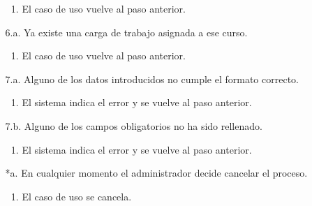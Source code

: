 \documentclass{book}
\begin{document}
\begin{itemize}
\begin{itemize}
		\begin{enumerate}
		\item El caso de uso vuelve al paso anterior.
		\end{enumerate}
	\item[6.a.] Ya existe una carga de trabajo asignada a ese curso.
		\begin{enumerate}
		\item El caso de uso vuelve al paso anterior.
		\end{enumerate}
	\item[7.a.] Alguno de los datos introducidos no cumple el formato correcto.
		\begin{enumerate}
		\item El sistema indica el error y se vuelve al paso anterior.
		\end{enumerate}
	\item[7.b.] Alguno de los campos obligatorios no ha sido rellenado.
		\begin{enumerate}
		\item El sistema indica el error y se vuelve al paso anterior.
		\end{enumerate}
	\item[*a.] En cualquier momento el administrador decide cancelar el proceso.
		\begin{enumerate}
		\item El caso de uso se cancela.
		\end{enumerate}
	\end{itemize}
\end{itemize}
\end{document}
